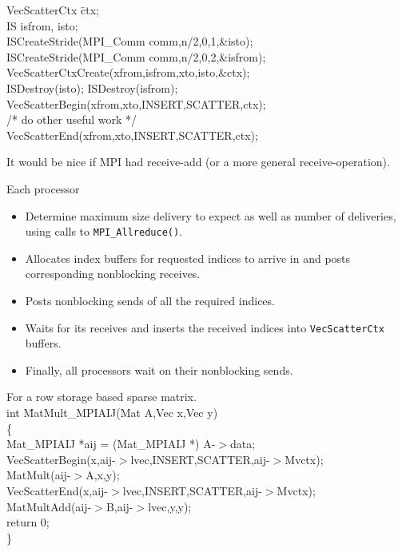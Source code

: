 \ve

\begin{tabbing}
        VecScatterCtx \= ctx; \\
        IS       \>     isfrom, isto;\\
        ISCreateStride(MPI\_Comm comm,n/2,0,1,\&isto);\\
        ISCreateStride(MPI\_Comm comm,n/2,0,2,\&isfrom);\\
        VecScatterCtxCreate(xfrom,isfrom,xto,isto,\&ctx);\\
        ISDestroy(isto); ISDestroy(isfrom);\\
        VecScatterBegin(xfrom,xto,INSERT,SCATTER,ctx);\\
        /* do other useful work */\\
        VecScatterEnd(xfrom,xto,INSERT,SCATTER,ctx);\\
\end{tabbing}

It would be nice if MPI had receive-add (or a more general 
receive-operation). 
\ve

Each processor
\begin{itemize}
\item Determine maximum size delivery to expect
      as well as  number of deliveries, using
      calls to {\tt MPI\_Allreduce()}. 
\item Allocates index buffers for requested indices
      to arrive in and posts corresponding nonblocking receives.
\item Posts nonblocking sends of all the required indices.
\stripe
\item Waits for its receives and inserts the received 
      indices into {\tt VecScatterCtx} buffers.
\item Finally, all processors wait on their nonblocking sends.
\end{itemize}

\ve

\begin{tabbing}
For a row storage based sparse matrix.\\
       int \= MatMult\_MPIAIJ(Mat A,Vec x,Vec y)\\
        \{\\
    \>      Mat\_MPIAIJ *aij = (Mat\_MPIAIJ *) A-$>$data;\\
    \>      VecScatterBegin(x,aij-$>$lvec,INSERT,SCATTER,aij-$>$Mvctx);\\
    \>      MatMult(aij-$>$A,x,y);\\
    \>      VecScatterEnd(x,aij-$>$lvec,INSERT,SCATTER,aij-$>$Mvctx);\\
    \>      MatMultAdd(aij-$>$B,aij-$>$lvec,y,y);\\
    \>      return 0;\\
        \}
\end{tabbing}
\ve

